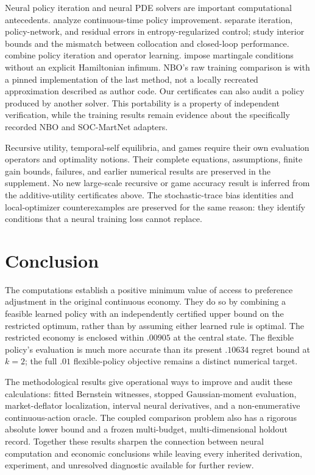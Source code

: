 Neural policy iteration and neural PDE solvers are important computational antecedents. \citet{jacka2015} analyze continuous-time policy improvement. \citet{kim2026explore} separate iteration, policy-network, and residual errors in entropy-regularized control; \citet{kim2026interior} study interior bounds and the mismatch between collocation and closed-loop performance. \citet{lee2025} combine policy iteration and operator learning. \citet{cai2025published} impose martingale conditions without an explicit Hamiltonian infimum. NBO's raw training comparison is with a pinned implementation of the last method, not a locally recreated approximation described as author code. Our certificates can also audit a policy produced by another solver. This portability is a property of independent verification, while the training results remain evidence about the specifically recorded NBO and SOC-MartNet adapters.

Recursive utility, temporal-self equilibria, and games require their own evaluation operators and optimality notions. Their complete equations, assumptions, finite gain bounds, failures, and earlier numerical results are preserved in the supplement. No new large-scale recursive or game accuracy result is inferred from the additive-utility certificates above. The stochastic-trace bias identities and local-optimizer counterexamples are preserved for the same reason: they identify conditions that a neural training loss cannot replace.

\section{Conclusion}
The computations establish a positive minimum value of access to preference adjustment in the original continuous economy. They do so by combining a feasible learned policy with an independently certified upper bound on the restricted optimum, rather than by assuming either learned rule is optimal. The restricted economy is enclosed within $.00905$ at the central state. The flexible policy's evaluation is much more accurate than its present $.10634$ regret bound at $k=2$; the full $.01$ flexible-policy objective remains a distinct numerical target.

The methodological results give operational ways to improve and audit these calculations: fitted Bernstein witnesses, stopped Gaussian-moment evaluation, market-deflator localization, interval neural derivatives, and a non-enumerative continuous-action oracle. The coupled comparison problem also has a rigorous absolute lower bound and a frozen multi-budget, multi-dimensional holdout record. Together these results sharpen the connection between neural computation and economic conclusions while leaving every inherited derivation, experiment, and unresolved diagnostic available for further review.
